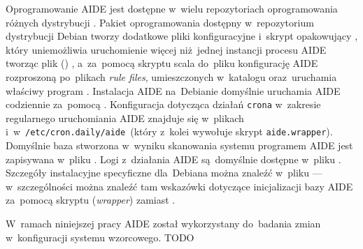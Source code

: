 \documentclass[thesis]{subfiles}
\begin{document}
Oprogramowanie AIDE jest dostępne w~wielu repozytoriach oprogramowania różnych dystrybucji . Pakiet oprogramowania dostępny w~repozytorium dystrybucji Debian tworzy dodatkowe pliki konfiguracyjne i~skrypt opakowujący , który uniemożliwia uruchomienie więcej niż~jednej instancji procesu AIDE tworząc plik () , a~za~pomocą skryptu  scala do~pliku  konfigurację AIDE rozproszoną po~plikach \emph{rule files}, umieszczonych w~katalogu  oraz~uruchamia właściwy program . Instalacja AIDE na~Debianie domyślnie uruchamia AIDE codziennie za~pomocą . Konfiguracja dotycząca działań \texttt{crona} w~zakresie regularnego uruchomiania AIDE znajduje się w~plikach  i~w~\texttt{/etc/cron.daily/aide}~(który z~kolei wywołuje skrypt \texttt{aide.wrapper}). Domyślnie baza stworzona w~wyniku skanowania systemu programem AIDE jest zapisywana w~pliku . Logi z~działania AIDE są~domyślnie dostępne w~pliku . Szczegóły instalacyjne specyficzne dla~Debiana można znaleźć w~pliku  --- w~szczególności można znaleźć tam wskazówki dotyczące inicjalizacji bazy AIDE za~pomocą skryptu  (\emph{wrapper}) zamiast .

W~ramach niniejszej pracy AIDE został wykorzystany do~badania zmian w~konfiguracji systemu wzorcowego. TODO
\end{document}
